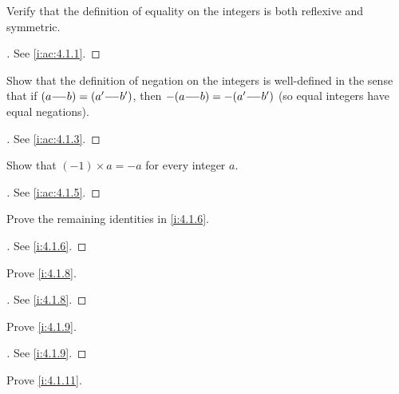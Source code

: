 \exercisesection

\begin{ex}\label{i:ex:4.1.1}
  Verify that the definition of equality on the integers is both reflexive and symmetric.
\end{ex}

\begin{proof}[]
  See \cref{i:ac:4.1.1}.
\end{proof}

\begin{ex}\label{i:ex:4.1.2}
  Show that the definition of negation on the integers is well-defined in the sense that if \((a {-}\!{-} b) = (a' {-}\!{-} b')\), then \(-(a {-}\!{-} b) = -(a' {-}\!{-} b')\)
  (so equal integers have equal negations).
\end{ex}

\begin{proof}[]
  See \cref{i:ac:4.1.3}.
\end{proof}

\begin{ex}\label{i:ex:4.1.3}
  Show that \((-1) \times a = -a\) for every integer \(a\).
\end{ex}

\begin{proof}[]
  See \cref{i:ac:4.1.5}.
\end{proof}

\begin{ex}\label{i:ex:4.1.4}
  Prove the remaining identities in \cref{i:4.1.6}.
\end{ex}

\begin{proof}[]
  See \cref{i:4.1.6}.
\end{proof}

\begin{ex}\label{i:ex:4.1.5}
  Prove \cref{i:4.1.8}.
\end{ex}

\begin{proof}[]
  See \cref{i:4.1.8}.
\end{proof}

\begin{ex}\label{i:ex:4.1.6}
  Prove \cref{i:4.1.9}.
\end{ex}

\begin{proof}[]
  See \cref{i:4.1.9}.
\end{proof}

\begin{ex}\label{i:ex:4.1.7}
  Prove \cref{i:4.1.11}.
\end{ex}

